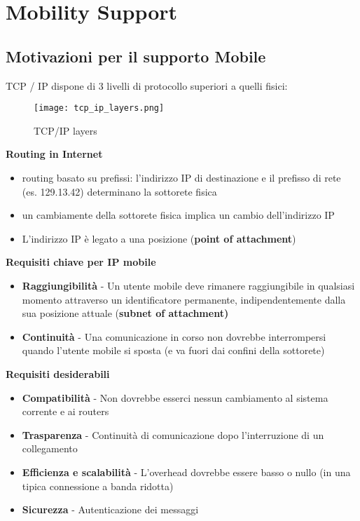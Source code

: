 \chapter{Mobility Support}
\label{mobility support}

\section{Motivazioni per il supporto Mobile}

TCP / IP dispone di 3 livelli di protocollo superiori a quelli fisici:

\begin{figure}[H]
  \centering
  \texttt{[image: tcp\_ip\_layers.png]}
  \caption{TCP/IP layers}
  \label{fig:tcpiplayers}
\end{figure}

\textbf{Routing in Internet}

\begin{itemize}
  \item routing basato su prefissi: l'indirizzo IP di destinazione e il
prefisso di rete (es. 129.13.42) determinano la sottorete fisica
  \item un cambiamente della sottorete fisica implica un cambio
dell'indirizzo IP
  \item L'indirizzo IP è legato a una posizione (\textbf{point of attachment})
\end{itemize}

\textbf{Requisiti chiave per IP mobile}

\begin{itemize}
  \item \textbf{Raggiungibilità} - Un utente mobile deve rimanere
raggiungibile in qualsiasi momento attraverso un identificatore
permanente, indipendentemente dalla sua posizione attuale
(\textbf{subnet of attachment)}
  \item \textbf{Continuità} - Una comunicazione in corso non
dovrebbe interrompersi quando l'utente mobile si sposta (e va fuori dai
confini della sottorete)
\end{itemize}

\textbf{Requisiti desiderabili}

\begin{itemize}
  \item \textbf{Compatibilità} - Non dovrebbe esserci nessun cambiamento al
sistema corrente e ai routers
  \item \textbf{Trasparenza} - Continuità di comunicazione dopo l'interruzione
di un collegamento
  \item \textbf{Efficienza e scalabilità} - L'overhead dovrebbe essere
basso o nullo (in una tipica connessione a banda ridotta)
  \item \textbf{Sicurezza} - Autenticazione dei messaggi
\end{itemize}

